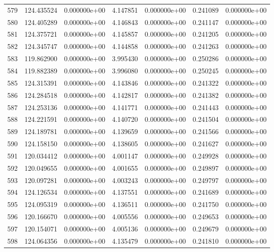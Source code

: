 \begin{tabular}{rrrrrrr}
 579 & 124.435524 &  0.000000e+00 &  4.147851 &  0.000000e+00 &   0.241089 &  0.000000e+00 \\
 580 & 124.405289 &  0.000000e+00 &  4.146843 &  0.000000e+00 &   0.241147 &  0.000000e+00 \\
 581 & 124.375721 &  0.000000e+00 &  4.145857 &  0.000000e+00 &   0.241205 &  0.000000e+00 \\
 582 & 124.345747 &  0.000000e+00 &  4.144858 &  0.000000e+00 &   0.241263 &  0.000000e+00 \\
 583 & 119.862900 &  0.000000e+00 &  3.995430 &  0.000000e+00 &   0.250286 &  0.000000e+00 \\
 584 & 119.882389 &  0.000000e+00 &  3.996080 &  0.000000e+00 &   0.250245 &  0.000000e+00 \\
 585 & 124.315391 &  0.000000e+00 &  4.143846 &  0.000000e+00 &   0.241322 &  0.000000e+00 \\
 586 & 124.284518 &  0.000000e+00 &  4.142817 &  0.000000e+00 &   0.241382 &  0.000000e+00 \\
 587 & 124.253136 &  0.000000e+00 &  4.141771 &  0.000000e+00 &   0.241443 &  0.000000e+00 \\
 588 & 124.221591 &  0.000000e+00 &  4.140720 &  0.000000e+00 &   0.241504 &  0.000000e+00 \\
 589 & 124.189781 &  0.000000e+00 &  4.139659 &  0.000000e+00 &   0.241566 &  0.000000e+00 \\
 590 & 124.158150 &  0.000000e+00 &  4.138605 &  0.000000e+00 &   0.241627 &  0.000000e+00 \\
 591 & 120.034412 &  0.000000e+00 &  4.001147 &  0.000000e+00 &   0.249928 &  0.000000e+00 \\
 592 & 120.049655 &  0.000000e+00 &  4.001655 &  0.000000e+00 &   0.249897 &  0.000000e+00 \\
 593 & 120.097281 &  0.000000e+00 &  4.003243 &  0.000000e+00 &   0.249797 &  0.000000e+00 \\
 594 & 124.126534 &  0.000000e+00 &  4.137551 &  0.000000e+00 &   0.241689 &  0.000000e+00 \\
 595 & 124.095319 &  0.000000e+00 &  4.136511 &  0.000000e+00 &   0.241750 &  0.000000e+00 \\
 596 & 120.166670 &  0.000000e+00 &  4.005556 &  0.000000e+00 &   0.249653 &  0.000000e+00 \\
 597 & 120.154071 &  0.000000e+00 &  4.005136 &  0.000000e+00 &   0.249679 &  0.000000e+00 \\
 598 & 124.064356 &  0.000000e+00 &  4.135479 &  0.000000e+00 &   0.241810 &  0.000000e+00 \\

\end{tabular}
